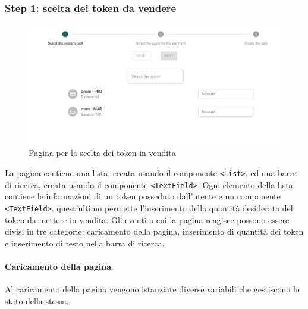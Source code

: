 \documentclass[a4paper]{article}
\begin{document}
        \subsubsection{Step 1: scelta dei token da vendere}
        \begin{figure}[h]
          \includegraphics[width=\textwidth]{coinsToSell.png}
          \caption{Pagina per la scelta dei token in vendita}
          \centering
          \label{fig:resume}
        \end{figure}
        La pagina contiene una lista, creata usando il componente \verb|<List>|, ed una barra di ricerca, creata usando il componente \verb|<TextField>|.
        \newline
        Ogni elemento della lista contiene le informazioni di un token posseduto dall'utente e un componente
        \verb|<TextField>|, quest'ultimo permette l'inserimento della quantità desiderata del token da mettere in vendita.
        Gli eventi a cui la pagina reagisce possono essere divisi in tre categorie: caricamento della pagina, inserimento di quantità dei token e
        inserimento di testo nella barra di ricerca.
        \paragraph{Caricamento della pagina}
        Al caricamento della pagina vengono istanziate diverse variabili che gestiscono lo stato della stessa.
        \printbibliography
\end{document}
